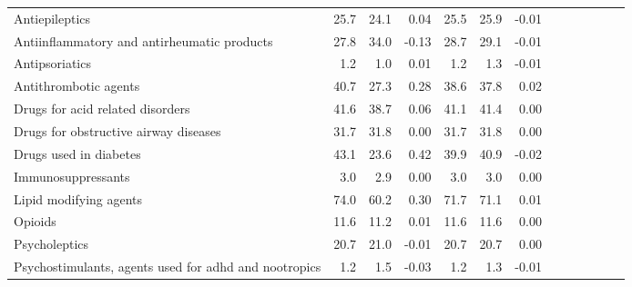 \documentclass[11pt,]{article}
\begin{document}
\begin{longtable}{lrrrrrrrrrrrr}
      Antiepileptics & 25.7 & 24.1 &  0.04 & 25.5 & 25.9 & -0.01 \\ 
      Antiinflammatory and antirheumatic products & 27.8 & 34.0 & -0.13 & 28.7 & 29.1 & -0.01 \\ 
      Antipsoriatics &  1.2 &  1.0 &  0.01 &  1.2 &  1.3 & -0.01 \\ 
      Antithrombotic agents & 40.7 & 27.3 &  0.28 & 38.6 & 37.8 &  0.02 \\ 
      Drugs for acid related disorders & 41.6 & 38.7 &  0.06 & 41.1 & 41.4 &  0.00 \\ 
      Drugs for obstructive airway diseases & 31.7 & 31.8 &  0.00 & 31.7 & 31.8 &  0.00 \\ 
      Drugs used in diabetes & 43.1 & 23.6 &  0.42 & 39.9 & 40.9 & -0.02 \\ 
      Immunosuppressants &  3.0 &  2.9 &  0.00 &  3.0 &  3.0 &  0.00 \\ 
      Lipid modifying agents & 74.0 & 60.2 &  0.30 & 71.7 & 71.1 &  0.01 \\ 
      Opioids & 11.6 & 11.2 &  0.01 & 11.6 & 11.6 &  0.00 \\ 
      Psycholeptics & 20.7 & 21.0 & -0.01 & 20.7 & 20.7 &  0.00 \\ 
      Psychostimulants, agents used for adhd and nootropics &  1.2 &  1.5 & -0.03 &  1.2 &  1.3 & -0.01 \\ 
   \bottomrule\end{longtable}
\clearpage
{}
\end{document}

